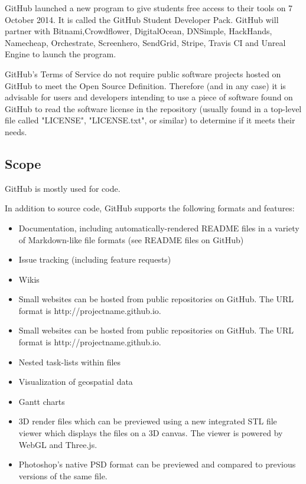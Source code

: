 \documentclass{article}\usepackage[]{graphicx}\usepackage[]{color}
\begin{document}
\par GitHub launched a new program to give students free access to their tools on 7 October 2014. It is called the GitHub Student Developer Pack. GitHub will partner with Bitnami,Crowdflower, DigitalOcean, DNSimple, HackHands, Namecheap, Orchestrate, Screenhero, SendGrid, Stripe, Travis CI and Unreal Engine to launch the program. \smallskip
\par GitHub's Terms of Service do not require public software projects hosted on GitHub to meet the Open Source Definition. Therefore (and in any case) it is advisable for users and developers intending to use a piece of software found on GitHub to read the software license in the repository (usually found in a top-level file called "LICENSE", "LICENSE.txt", or similar) to determine if it meets their needs.



\subsection*{Scope}
GitHub is mostly used for code. \smallskip

In addition to source code, GitHub supports the following formats and features:

\begin{itemize}
\item Documentation, including automatically-rendered README files in a variety of Markdown-like file formats (see README files on GitHub)
\item Issue tracking (including feature requests)
\item Wikis
\item Small websites can be hosted from public repositories on GitHub. The URL format is http://projectname.github.io.
\item Small websites can be hosted from public repositories on GitHub. The URL format is http://projectname.github.io.
\item Nested task-lists within files
\item Visualization of geospatial data
\item Gantt charts
\item 3D render files which can be previewed using a new integrated STL file viewer which displays the files on a 3D canvas. The viewer is powered by WebGL and Three.js.
\item Photoshop's native PSD format can be previewed and compared to previous versions of the same file.
\end{itemize}
\end{document}
